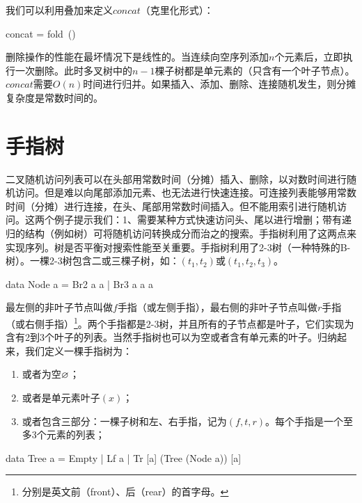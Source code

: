 \documentclass[b5paper]{ctexart}
\begin{document}
我们可以利用叠加来定义$concat$（克里化形式）：

\be
concat = fold\ (\doubleplus)\ \nil
\ee

删除操作的性能在最坏情况下是线性的。当连续向空序列添加$n$个元素后，立即执行一次删除。此时多叉树中的$n-1$棵子树都是单元素的（只含有一个叶子节点）。$concat$需要$O(n)$时间进行归并。如果插入、添加、删除、连接随机发生，则分摊复杂度是常数时间的。

\begin{Exercise}
\end{Exercise}

\section{手指树}

二叉随机访问列表可以在头部用常数时间（分摊）插入、删除，以对数时间进行随机访问。但是难以向尾部添加元素、也无法进行快速连接。可连接列表能够用常数时间（分摊）进行连接，在头、尾部用常数时间插入。但不能用索引进行随机访问。这两个例子提示我们：1、需要某种方式快速访问头、尾以进行增删；带有递归的结构（例如树）可将随机访问转换成分而治之的搜索。手指树\cite{finger-tree-1977}利用了这两点来实现序列\cite{finger-tree-2006}。树是否平衡对搜索性能至关重要。手指树利用了2-3树（一种特殊的B-树）。一棵2-3树包含二或三棵子树，如：$(t_1, t_2)$或$(t_1, t_2, t_3)$。

\lstset{frame = single}
\begin{Haskell}
data Node a = Br2 a a | Br3 a a a
\end{Haskell}

最左侧的非叶子节点叫做$f$手指（或左侧手指），最右侧的非叶子节点叫做$r$手指（或右侧手指）\footnote{分别是英文前（front）、后（rear）的首字母。}。两个手指都是2-3树，并且所有的子节点都是叶子，它们实现为含有2到3个叶子的列表。当然手指树也可以为空或者含有单元素的叶子。归纳起来，我们定义一棵手指树为：

\begin{enumerate}
\item 或者为空$\varnothing$；
\item 或者是单元素叶子$(x)$；
\item 或者包含三部分：一棵子树和左、右手指，记为$(f, t, r)$。每个手指是一个至多3个元素的列表；
\end{enumerate}

\begin{Haskell}
data Tree a = Empty
            | Lf a
            | Tr [a] (Tree (Node a)) [a]
\end{Haskell}
\end{document}
